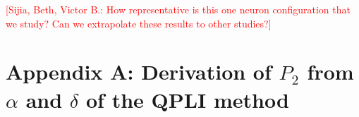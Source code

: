 \documentclass[]{interact}
\newcommand{\red}[1]{\textcolor{red}{[#1]}}
\begin{document}
\red{Sijia, Beth, Victor B.: How representative is this one neuron configuration that we study? Can we extrapolate these results to other studies?} 



%
\newpage





\appendix
\section*{Appendix A: Derivation of $P_2$ from $\alpha$ and $\delta$ of the QPLI method}
\label{app:P2_derivation}
\end{document}
